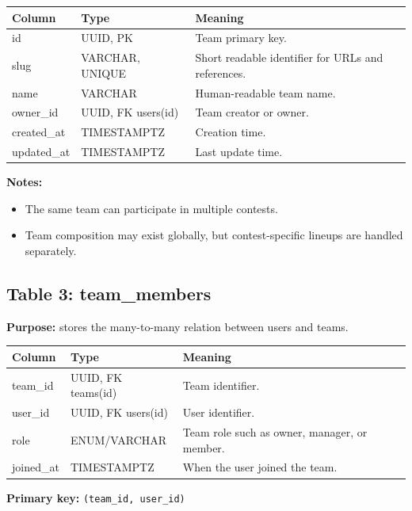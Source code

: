 \documentclass[11pt,a4paper]{article}
\begin{document}
\begin{longtable}{>{\raggedright\arraybackslash}p{} >{\raggedright\arraybackslash}p{} >{\raggedright\arraybackslash}p{}}
\toprule
\textbf{Column} & \textbf{Type} & \textbf{Meaning} \\
\midrule
id & UUID, PK & Team primary key. \\
slug & VARCHAR, UNIQUE & Short readable identifier for URLs and references. \\
name & VARCHAR & Human-readable team name. \\
owner\_id & UUID, FK users(id) & Team creator or owner. \\
created\_at & TIMESTAMPTZ & Creation time. \\
updated\_at & TIMESTAMPTZ & Last update time. \\
\bottomrule
\end{longtable}

\textbf{Notes:}
\begin{itemize}
    \item The same team can participate in multiple contests.
    \item Team composition may exist globally, but contest-specific lineups are handled separately.
\end{itemize}

\subsection{Table 3: team\_members}
\textbf{Purpose:} stores the many-to-many relation between users and teams.

\begin{longtable}{>{\raggedright\arraybackslash}p{} >{\raggedright\arraybackslash}p{} >{\raggedright\arraybackslash}p{}}
\toprule
\textbf{Column} & \textbf{Type} & \textbf{Meaning} \\
\midrule
team\_id & UUID, FK teams(id) & Team identifier. \\
user\_id & UUID, FK users(id) & User identifier. \\
role & ENUM/VARCHAR & Team role such as owner, manager, or member. \\
joined\_at & TIMESTAMPTZ & When the user joined the team. \\
\bottomrule
\end{longtable}

\textbf{Primary key:} \texttt{(team\_id, user\_id)}
\end{document}
